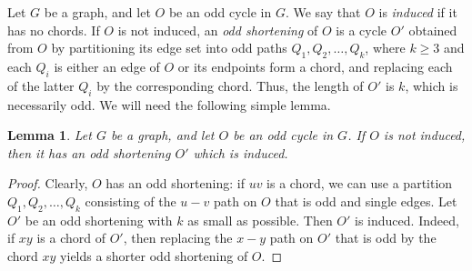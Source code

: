 \documentclass[10pt,a4paper]{amsart}
\newtheorem{lemma}[theorem]{Lemma}
\begin{document}
Let $G$ be a graph, and let $O$ be an odd cycle in $G$. We say that $O$ is \emph{induced} if it has no chords. If $O$ is not induced, an \emph{odd shortening} of $O$ is a cycle $O'$ obtained from $O$ by partitioning its edge set into odd paths $Q_1, Q_2, \ldots , Q_k$, where $k \ge 3$ and each $Q_i$ is either an edge of $O$ or its endpoints form a chord, and replacing each of the latter $Q_i$ by the corresponding chord. Thus, the length of $O'$ is $k$, which is necessarily odd. We will need the following simple lemma.
\begin{lemma} \label{lem:Short}
Let $G$ be a graph, and let $O$ be an odd cycle in $G$. If $O$ is not induced, then it has an odd shortening $O'$ which is induced.
\end{lemma}
\begin{proof} Clearly, $O$ has an odd shortening: if $uv$ is a chord, we can use a partition $Q_1, Q_2, \ldots , Q_k$ consisting of the $u-v$ path on $O$ that is odd and single edges. Let $O'$ be an odd shortening with $k$ as small as possible. Then $O'$ is induced. Indeed, if $xy$ is a chord of $O'$, then replacing the $x-y$ path on $O'$ that is odd by the chord $xy$ yields a shorter odd shortening of $O$.
\end{proof}
\end{document}
